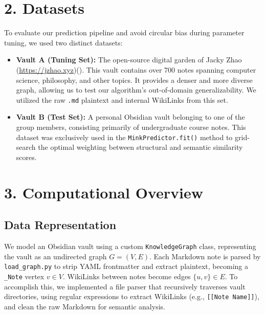 \documentclass[fontsize=11pt]{article}
\begin{document}
\section*{2. Datasets}

To evaluate our prediction pipeline and avoid circular bias during parameter tuning, we used two distinct datasets:
\begin{itemize}
    \item \textbf{Vault A (Tuning Set):} The open-source digital garden of Jacky Zhao (\url{https://jzhao.xyz})(\cite{zhao_digitalgarden}). This vault contains over 700 notes spanning computer science, philosophy, and other topics. It provides a denser and more diverse graph, allowing us to test our algorithm's out-of-domain generalizability. We utilized the raw \texttt{.md} plaintext and internal WikiLinks from this set.
    \item \textbf{Vault B (Test Set):} A personal Obsidian vault belonging to one of the group members, consisting primarily of undergraduate course notes. This dataset was exclusively used in the \texttt{MinkPredictor.fit()} method to grid-search the optimal weighting between structural and semantic similarity scores.
\end{itemize}

\section*{3. Computational Overview}

\subsection*{Data Representation}
We model an Obsidian vault using a custom \texttt{KnowledgeGraph} class, representing the vault as an undirected graph $G = (V, E)$. Each Markdown note is parsed by \texttt{load\_graph.py} to strip YAML frontmatter and extract plaintext, becoming a \texttt{\_Note} vertex $v \in V$. WikiLinks between notes become edges $\{u, v\} \in E$. To accomplish this, we implemented a file parser that recursively traverses vault directories, using regular expressions to extract WikiLinks (e.g., \texttt{[[Note Name]]}), and clean the raw Markdown for semantic analysis.
\end{document}
